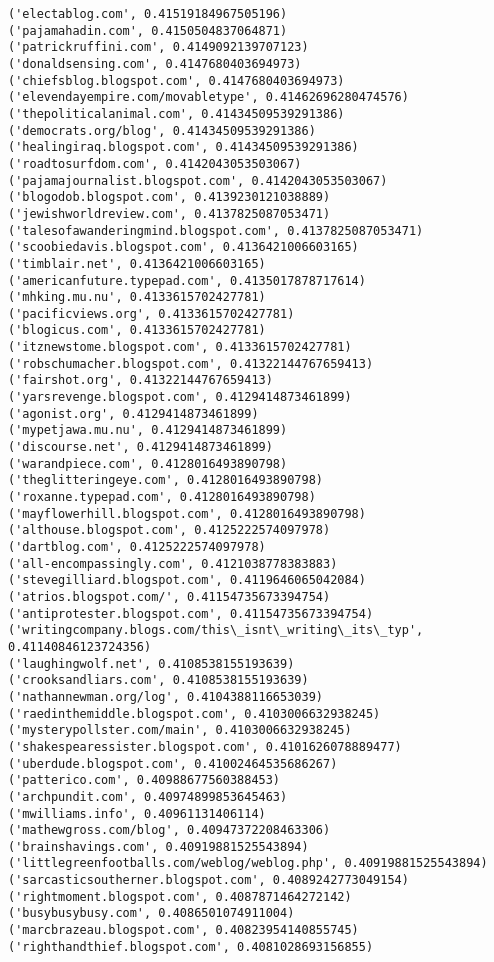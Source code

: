 \documentclass[11pt]{article}
\begin{document}
\begin{Verbatim}[commandchars=\\\{\}]
('electablog.com', 0.41519184967505196)
('pajamahadin.com', 0.4150504837064871)
('patrickruffini.com', 0.4149092139707123)
('donaldsensing.com', 0.4147680403694973)
('chiefsblog.blogspot.com', 0.4147680403694973)
('elevendayempire.com/movabletype', 0.41462696280474576)
('thepoliticalanimal.com', 0.41434509539291386)
('democrats.org/blog', 0.41434509539291386)
('healingiraq.blogspot.com', 0.41434509539291386)
('roadtosurfdom.com', 0.4142043053503067)
('pajamajournalist.blogspot.com', 0.4142043053503067)
('blogodob.blogspot.com', 0.4139230121038889)
('jewishworldreview.com', 0.4137825087053471)
('talesofawanderingmind.blogspot.com', 0.4137825087053471)
('scoobiedavis.blogspot.com', 0.4136421006603165)
('timblair.net', 0.4136421006603165)
('americanfuture.typepad.com', 0.4135017878717614)
('mhking.mu.nu', 0.4133615702427781)
('pacificviews.org', 0.4133615702427781)
('blogicus.com', 0.4133615702427781)
('itznewstome.blogspot.com', 0.4133615702427781)
('robschumacher.blogspot.com', 0.41322144767659413)
('fairshot.org', 0.41322144767659413)
('yarsrevenge.blogspot.com', 0.4129414873461899)
('agonist.org', 0.4129414873461899)
('mypetjawa.mu.nu', 0.4129414873461899)
('discourse.net', 0.4129414873461899)
('warandpiece.com', 0.4128016493890798)
('theglitteringeye.com', 0.4128016493890798)
('roxanne.typepad.com', 0.4128016493890798)
('mayflowerhill.blogspot.com', 0.4128016493890798)
('althouse.blogspot.com', 0.4125222574097978)
('dartblog.com', 0.4125222574097978)
('all-encompassingly.com', 0.4121038778383883)
('stevegilliard.blogspot.com', 0.4119646065042084)
('atrios.blogspot.com/', 0.41154735673394754)
('antiprotester.blogspot.com', 0.41154735673394754)
('writingcompany.blogs.com/this\_isnt\_writing\_its\_typ', 0.41140846123724356)
('laughingwolf.net', 0.4108538155193639)
('crooksandliars.com', 0.4108538155193639)
('nathannewman.org/log', 0.4104388116653039)
('raedinthemiddle.blogspot.com', 0.4103006632938245)
('mysterypollster.com/main', 0.4103006632938245)
('shakespearessister.blogspot.com', 0.4101626078889477)
('uberdude.blogspot.com', 0.41002464535686267)
('patterico.com', 0.40988677560388453)
('archpundit.com', 0.40974899853645463)
('mwilliams.info', 0.40961131406114)
('mathewgross.com/blog', 0.40947372208463306)
('brainshavings.com', 0.40919881525543894)
('littlegreenfootballs.com/weblog/weblog.php', 0.40919881525543894)
('sarcasticsoutherner.blogspot.com', 0.4089242773049154)
('rightmoment.blogspot.com', 0.4087871464272142)
('busybusybusy.com', 0.4086501074911004)
('marcbrazeau.blogspot.com', 0.40823954140855745)
('righthandthief.blogspot.com', 0.4081028693156855)

\end{Verbatim}
\end{document}
